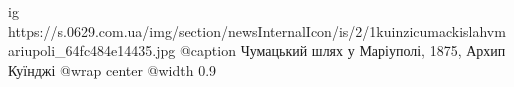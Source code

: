  
 
 
 
 

\ifcmt
  ig https://s.0629.com.ua/img/section/newsInternalIcon/is/2/1kuinzicumackislahvmariupoli_64fc484e14435.jpg
	@caption Чумацький шлях у Маріуполі, 1875, Архип Куїнджі
  @wrap center
  @width 0.9
\fi
